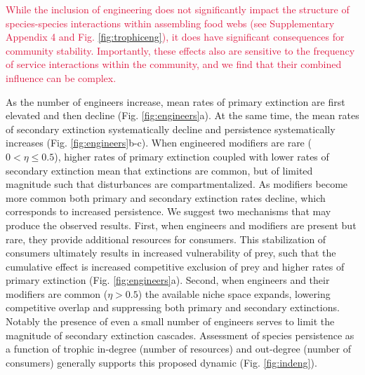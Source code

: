 \documentclass[twocolumn,preprintnumbers,amsmath,amssymb,superscriptaddress,linenumbers]{revtex4-1}
\newcommand{\rev}[1]{\textcolor{crimson}{#1}}
\begin{document}
\rev{While the inclusion of engineering does not significantly impact the structure of species-species interactions within assembling food webs (see Supplementary Appendix 4 and Fig. \ref{fig:trophiceng}), it does have significant consequences for community stability.
Importantly, these effects also are sensitive to the frequency of service interactions within the community, and we find that their combined influence can be complex.}


As the number of engineers increase, mean rates of primary extinction are first elevated and then decline (Fig. \ref{fig:engineers}a).
At the same time, the mean rates of secondary extinction systematically decline and persistence systematically increases (Fig. \ref{fig:engineers}b-c).
When engineered modifiers are rare ($0 < \eta \leq 0.5$), higher rates of primary extinction coupled with lower rates of secondary extinction mean that extinctions are common, but of limited magnitude such that disturbances are compartmentalized.
As modifiers become more common both primary and secondary extinction rates decline, which corresponds to increased persistence.
We suggest two mechanisms that may produce the observed results.
First, when engineers and modifiers are present but rare, they provide additional resources for consumers.
This stabilization of consumers ultimately results in increased vulnerability of prey, such that the cumulative effect is increased competitive exclusion of prey and higher rates of primary extinction (Fig. \ref{fig:engineers}a).
Second, when engineers and their modifiers are common ($\eta > 0.5$) the available niche space expands, lowering competitive overlap and suppressing both primary and secondary extinctions.
Notably the presence of even a small number of engineers serves to limit the magnitude of secondary extinction cascades.
Assessment of species persistence as a function of trophic in-degree (number of resources) and out-degree (number of consumers) generally supports this proposed dynamic (Fig. \ref{fig:indeng}).
\end{document}
